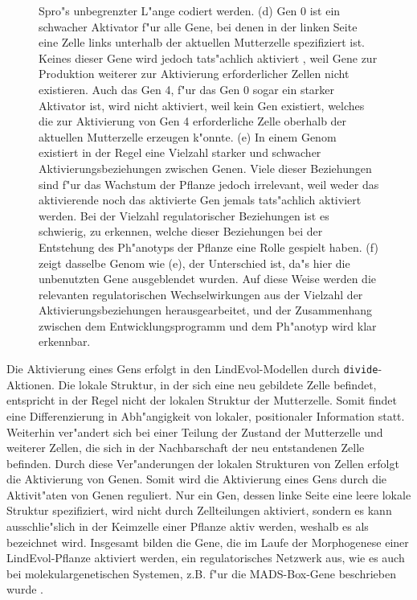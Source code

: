 \begin{figure}
{Spro"s unbegrenzter L"ange codiert werden. (d) Gen 0 ist ein schwacher Aktivator
f"ur alle Gene, bei denen in der linken Seite eine Zelle links unterhalb der aktuellen
Mutterzelle spezifiziert ist. Keines dieser Gene wird jedoch tats"achlich aktiviert , weil 
Gene zur Produktion weiterer zur Aktivierung erforderlicher Zellen nicht existieren.
Auch das Gen 4, f"ur das Gen 0 sogar ein starker Aktivator ist, wird nicht aktiviert,
weil kein Gen existiert, welches die zur Aktivierung von Gen 4 erforderliche Zelle
oberhalb der aktuellen Mutterzelle erzeugen k"onnte.
(e) In einem Genom existiert in der Regel eine Vielzahl
starker und schwacher Aktivierungsbeziehungen zwischen Genen. Viele dieser Beziehungen sind f"ur
das Wachstum der Pflanze jedoch irrelevant, weil weder das aktivierende noch das aktivierte Gen
jemals tats"achlich aktiviert werden. Bei der Vielzahl regulatorischer Beziehungen ist es
schwierig, zu erkennen, welche dieser Beziehungen bei der Entstehung des Ph"anotyps der Pflanze
eine Rolle gespielt haben. (f) zeigt dasselbe Genom wie (e), der Unterschied ist, da"s hier die unbenutzten
Gene ausgeblendet wurden. Auf diese Weise werden die relevanten regulatorischen Wechselwirkungen
aus der Vielzahl der Aktivierungsbeziehungen herausgearbeitet, und der Zusammenhang zwischen dem Entwicklungsprogramm
und dem Ph"anotyp wird klar erkennbar.
}
\end{figure}

Die Aktivierung eines Gens erfolgt in den LindEvol-Modellen durch \verb|divide|-Aktionen.
Die lokale Struktur, in der sich eine neu gebildete Zelle befindet, entspricht in der
Regel nicht der lokalen Struktur der Mutterzelle. Somit findet eine Differenzierung in
Abh"angigkeit von lokaler, positionaler Information statt.
Weiterhin ver"andert sich bei einer Teilung der Zustand der Mutterzelle und weiterer
Zellen, die sich in der Nachbarschaft der neu entstandenen Zelle befinden.
Durch diese Ver"anderungen der lokalen Strukturen von Zellen erfolgt die Aktivierung
von Genen. Somit wird die
Aktivierung eines Gens durch die Aktivit"aten von Genen reguliert.
Nur ein Gen, dessen linke Seite eine leere lokale Struktur spezifiziert, wird nicht
durch Zellteilungen aktiviert, sondern es kann ausschlie"slich in der Keimzelle einer
Pflanze aktiv werden, weshalb es als  bezeichnet wird.
Insgesamt bilden die Gene, die im Laufe der Morphogenese einer LindEvol-Pflanze aktiviert
werden, ein regulatorisches Netzwerk aus, wie es auch bei molekulargenetischen
Systemen, z.B. f"ur die MADS-Box-Gene beschrieben wurde \cite{Theissen95}.


